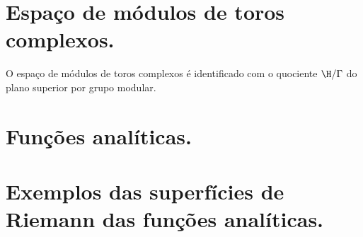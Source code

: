 \section{Espaço de módulos de toros complexos.}

\begin{teorema}
O espaço de módulos de toros complexos é identificado com o quociente $\H/\Gamma$
do plano superior por grupo modular.
\end{teorema}

\section{Funções analíticas.}

\section{Exemplos das superfícies de Riemann das funções analíticas.}

% 

